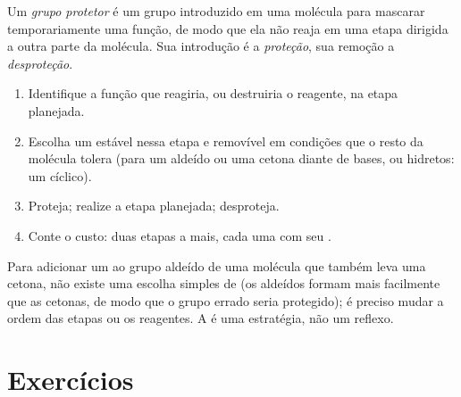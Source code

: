 \begin{definition}\label{def:b1:acetals-protection:protecting-group}
Um \emph{grupo protetor} é um grupo introduzido
em uma molécula para mascarar temporariamente uma função, de modo que ela
não reaja em uma etapa dirigida a outra parte da molécula. Sua introdução
é a \emph{proteção}, sua remoção a
\emph{desproteção}.
\end{definition}

\begin{method}\label{met:b1:acetals-protection:protect}
\begin{enumerate}
  \item Identifique a função que reagiria, ou destruiria o reagente, na
        etapa planejada.
  \item Escolha um  estável nessa etapa e removível em
        condições que o resto da molécula tolera (para um aldeído ou uma
        cetona diante de bases,  ou hidretos: um  cíclico).
  \item Proteja; realize a etapa planejada; desproteja.
  \item Conte o custo: duas etapas a mais, cada uma com seu .
\end{enumerate}
\end{method}

\begin{example}\label{ex:b1:acetals-protection:ketoester}
Para adicionar um  ao grupo aldeído de uma molécula
que também leva uma cetona, não existe uma escolha simples de  (os
aldeídos formam  mais facilmente que as cetonas, de modo que o
grupo errado seria protegido); é preciso mudar a ordem das etapas ou os
reagentes. A  é uma estratégia, não um reflexo.
\end{example}

\section{Exercícios}

